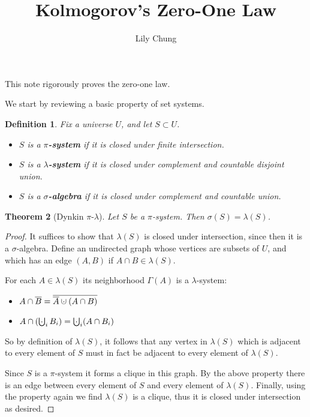 \documentclass[11pt,a4paper]{article}
\title{Kolmogorov's Zero-One Law}
\author{
  Lily Chung
}
\date{}
\makeatletter
\newtheorem{theorem}{Theorem}
\newtheorem{definition}[theorem]{Definition}
\newcommand*{\defn}[1]{\textbf{#1}}
\newcommand{\superimpose}[2]{{%
  \ooalign{%
    \hfil$\m@th#1\@firstoftwo#2$\hfil\cr
    \hfil$\m@th#1\@secondoftwo#2$\hfil\cr
  }%
}}
\newcommand{\dotcup}[0]{\mathbin{\mathpalette\superimpose{{\cdot}{\cup}}}}
\DeclareMathOperator*{\bigdotcup}{\mathpalette\superimpose{{\cdot}{\bigcup}}}
\makeatother
\begin{document}
\maketitle

This note rigorously proves the zero-one law.

We start by reviewing a basic property of set systems.

\begin{definition}
  Fix a universe $U$, and let $S \subset U$.
  \begin{itemize}
  \item $S$ is a \defn{$\pi$-system} if it is closed under finite intersection.
  \item $S$ is a \defn{$\lambda$-system} if it is closed under complement and countable disjoint union.
  \item $S$ is a \defn{$\sigma$-algebra} if it is closed under complement and countable union.
  \end{itemize}
\end{definition}

\begin{theorem}[Dynkin $\pi$-$\lambda$]
  \label{thm:dynkin}
  Let $S$ be a $\pi$-system.  Then $\sigma(S) = \lambda(S)$.
\end{theorem}
\begin{proof}
  It suffices to show that $\lambda(S)$ is closed under intersection,
  since then it is a $\sigma$-algebra.
  Define an undirected graph whose vertices are subsets of $U$,
  and which has an edge $(A, B)$ if $A \cap B \in \lambda(S)$.

  For each $A \in \lambda(S)$ its neighborhood $\Gamma(A)$ is a $\lambda$-system:
  \begin{itemize}
  \item $A \cap \overline{B} = \overline{\overline{A} \dotcup (A \cap B)}$
  \item $A \cap \left(\bigdotcup_i B_i\right) = \bigdotcup_i (A \cap B_i)$
  \end{itemize}
  So by definition of $\lambda(S)$, it follows that any vertex in $\lambda(S)$ which is adjacent to every element of $S$ must in fact be adjacent to every element of $\lambda(S)$.

  Since $S$ is a $\pi$-system it forms a clique in this graph.
  By the above property there is an edge between every element of $S$ and every element of $\lambda(S)$.
  Finally, using the property again we find $\lambda(S)$ is a clique,
  thus it is closed under intersection as desired.
\end{proof}
\end{document}
